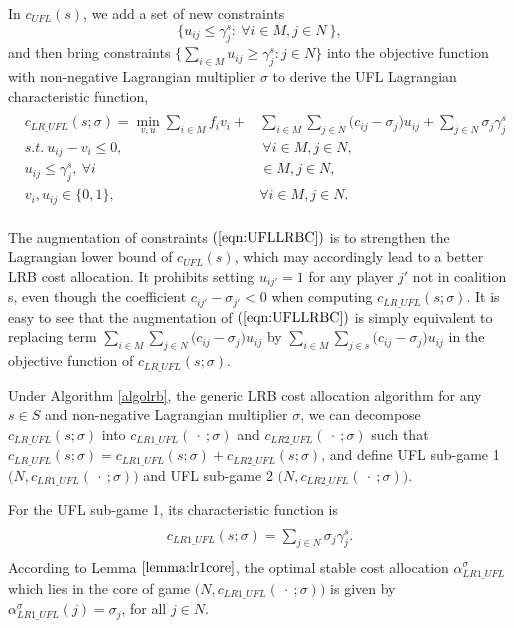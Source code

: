 \documentclass[ijoc,nonblindrev]{informs3} %
\begin{document}
In $c_{UFL}(s)$,  we add a set of new constraints
\begin{equation}\label{eqn:UFLLRBC}
\big\{ u_{ij} \leq \gamma_j^s: ~\forall i \in M, j \in N\ \big\},
\end{equation}
and then bring constraints $\{ \sum_{i \in M} u_{ij} \geq \gamma_j^s:j \in N \}$ into the objective function with non-negative Lagrangian multiplier $\sigma$ to derive the UFL Lagrangian characteristic function,
\begin{eqnarray*}\label{eqn:LRPGCF}
\begin{aligned}
\begin{split}
c_{LR\_UFL}(s;\sigma) = \min_{v,u} \sum_{i \in M} f_iv_i + &\sum_{i \in M} \sum_{j \in N} \big(c_{ij} - \sigma_{j}\big)u_{ij} + \sum_{j \in N} \sigma_j \gamma_j^s\\
s.t.~u_{ij} - v_i \leq 0,&~\forall i \in M, j \in N,\\
u_{ij} \leq \gamma_j^s,~\forall i& \in M, j \in N,\\
v_i,u_{ij} \in \{0,1\},~&\forall i \in M, j \in N.
\end{split}
\end{aligned}
\end{eqnarray*}


The augmentation of constraints $(\ref{eqn:UFLLRBC})$ is to strengthen the Lagrangian lower bound of $c_{UFL}(s)$, which may accordingly lead to a better LRB cost allocation.
It prohibits setting $u_{ij'}=1$ for any player $j'$ not in coalition s, even though the coefficient $c_{ij'}- \sigma_{j'}<0$ when computing $c_{LR\_UFL}(s;\sigma)$.
It is easy to see that the augmentation of $(\ref{eqn:UFLLRBC})$ is simply equivalent to replacing term $\sum_{i \in M} \sum_{j \in N} \big(c_{ij} - \sigma_{j}\big)u_{ij}$ by $\sum_{i \in M} \sum_{j \in s} \big(c_{ij} - \sigma_{j}\big)u_{ij}$ in the objective function of $c_{LR\_UFL}(s;\sigma)$.

Under Algorithm \ref{algolrb}, the generic LRB cost allocation algorithm for any $s \in S$ and non-negative Lagrangian multiplier $\sigma$, we can decompose $c_{LR\_UFL}(s;\sigma)$ into  $c_{LR1\_UFL}(\ \cdot \ ;\sigma)$ and $c_{LR2\_UFL}(\ \cdot \ ;\sigma)$ such that $c_{LR\_UFL}(s;\sigma) = c_{LR1\_UFL}(s;\sigma) + c_{LR2\_UFL}(s;\sigma)$, and define UFL sub-game 1 $\big(N,c_{LR1\_UFL}(\ \cdot \ ;\sigma)\big)$ and UFL sub-game 2  $\big(N,c_{LR2\_UFL}(\ \cdot \ ;\sigma)\big)$.

For the UFL sub-game 1, its characteristic function is
\begin{eqnarray}\label{eqn:UFLCFsub1}
\begin{aligned}
\begin{split}
c_{LR1\_UFL}(s;\sigma) = \sum_{j \in N} \sigma_j \gamma_j^s.
\end{split}
\end{aligned}
\end{eqnarray}
According to Lemma $\ref{lemma:lr1core}$,  the optimal stable cost allocation $\alpha_{LR1\_UFL}^{\sigma}$ which lies in the core of game $\big(N, c_{LR1\_UFL}(\ \cdot \ ;\sigma)\big)$ is given by $\alpha_{LR1\_UFL}^{\sigma}(j) = \sigma_j$, for all $j \in N$.
\end{document}
